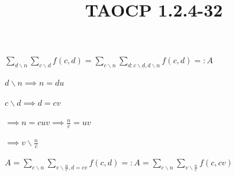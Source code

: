 \documentclass{article}
\title{TAOCP 1.2.4\mbox{-}32}
\begin{document}
\maketitle

\( \sum_{d \backslash n}\sum_{c \backslash d} f(c,d) = \sum_{c \backslash n}\sum_{d: c \backslash d, d\backslash n} f(c,d) =: A \)

\( d \backslash n \implies n = du \)

\( c \backslash d \implies d = cv \)

\( \implies n = cuv \implies \frac{n}{c} = uv \)

\( \implies v \backslash \frac{n}{c} \)

\( A = \sum_{c \backslash n}\sum_{v \backslash \frac{n}{c}, d = cv} f(c,d) =: A = \sum_{c \backslash n}\sum_{v \backslash \frac{n}{c}} f(c,cv) \)
\end{document}
